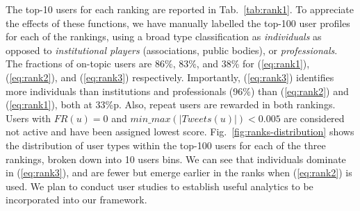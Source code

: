 The top-10 users for each ranking are reported in Tab.~\ref{tab:rank1}. To appreciate the effects of these functions, we have manually labelled the top-100 user profiles for each of the rankings, using a broad type classification as \textit{individuals} as opposed to \textit{institutional players} (associations, public bodies), or \textit{professionals}. 
%
The fractions of on-topic users are 86\%, 83\%, and 38\% for (\ref{eq:rank1}), (\ref{eq:rank2}), and (\ref{eq:rank3}) respectively.
Importantly, (\ref{eq:rank3}) identifies more individuals than institutions and professionals (96\%) than (\ref{eq:rank2}) and (\ref{eq:rank1}), both at 33\%p.
%
Also, repeat users are rewarded in both rankings. Users with $\mathit{FR}(u) = 0$ and $\mathit{min\_max(\lvert Tweets (u)\rvert) < 0.005}$ are considered not active and have been assigned lowest score.
Fig.~\ref{fig:ranks-distribution} shows the distribution of user types within the top-100 users for each of the three rankings, broken down into 10 users bins. We can see that individuals dominate in (\ref{eq:rank3}), and are fewer but emerge earlier in the ranks when (\ref{eq:rank2}) is used.
We plan to conduct user studies to establish useful analytics to be incorporated into our framework. 
